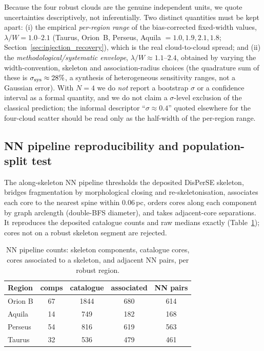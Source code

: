 \documentclass[usenatbib,twoside,twocolumn]{mnras}
\begin{document}
Because the four robust clouds are the genuine independent units, we quote uncertainties descriptively, not inferentially. Two distinct quantities must be kept apart: (i) the empirical \emph{per-region range} of the bias-corrected fixed-width values, $\lambda/W=1.0$--$2.1$ (Taurus, Orion~B, Perseus, Aquila $=1.0,1.9,2.1,1.8$; Section~\ref{sec:injection_recovery}), which is the real cloud-to-cloud spread; and (ii) the \emph{methodological/systematic envelope}, $\lambda/W\approx1.1$--$2.4$, obtained by varying the width-convention, skeleton and association-radius choices (the quadrature sum of these is $\sigma_{\rm sys}\approx28\%$, a synthesis of heterogeneous sensitivity ranges, not a Gaussian error). With $N=4$ we do \emph{not} report a bootstrap $\sigma$ or a confidence interval as a formal quantity, and we do not claim a $\sigma$-level exclusion of the classical prediction; the informal descriptor ``$\sigma\approx0.4$'' quoted elsewhere for the four-cloud scatter should be read only as the half-width of the per-region range.

\subsection{NN pipeline reproducibility and population-split test}
\label{sec:nnpipeline}

The along-skeleton NN pipeline thresholds the deposited DisPerSE skeleton, bridges fragmentation by morphological closing and re-skeletonisation, associates each core to the nearest spine within $0.06$\,pc, orders cores along each component by graph arclength (double-BFS diameter), and takes adjacent-core separations. It reproduces the deposited catalogue counts and raw medians exactly (Table~\ref{tab:nnpipeline}); cores not on a robust skeleton segment are rejected.

\begin{table}
\caption{NN pipeline counts: skeleton components, catalogue cores, cores associated to a skeleton, and adjacent NN pairs, per robust region.}
\label{tab:nnpipeline}
\footnotesize
\setlength{\tabcolsep}{4pt}
\begin{tabular}{lcccc}
\toprule
Region & comps & catalogue & associated & NN pairs \\
\midrule
Orion B & 67 & 1844 & 680 & 614 \\
Aquila  & 14 & 749  & 182 & 168 \\
Perseus & 54 & 816  & 619 & 563 \\
Taurus  & 32 & 536  & 479 & 461 \\
\bottomrule
\end{tabular}
\end{table}
\end{document}
